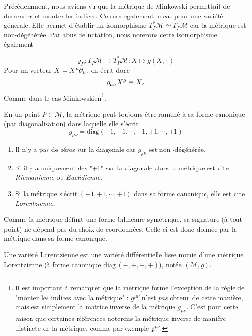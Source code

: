 Précédemment, nous avions vu que la métrique de Minkowski permettait de descendre et monter les indices. Ce sera également le cas pour une variété générale. Elle permet d'établir un isomorphisme $T^*_P \mathcal{M} \simeq T_P \mathcal{M}$ car la métrique est non-dégénérée. Par abus de notation, nous noterons cette isomorphisme également

\begin{equation}
    g_P:T_P \mathcal{M} \rightarrow T^*_P \mathcal{M}: X \mapsto g(X,\cdot\,)
\end{equation}
Pour un vecteur $X = X^\mu \partial_\mu$, on écrit donc
\begin{equation}
     g\indices{_\mu_\nu} X^\mu \equiv X_\nu
\end{equation}
Comme dans le cas Minkowskien\footnote{Il est important à remarquer que la métrique forme l'exception de la règle de "monter les indices avec la métrique" : $g^{\mu\nu}$ n'est \emph{pas} obtenu de cette manière, mais est simplement la matrice inverse de la métrique $g_{\mu\nu}$. C'est pour cette raison que certaines références noterons la métrique inverse de manière distincte de la métrique, comme par exemple $\mathfrak{g}^{\mu\nu}$.}.

\begin{rmk}
    En un point $P \in \mathcal{M}$, la métrique peut toujours être ramené à sa forme canonique (par diagonalisation) dans laquelle elle s'écrit 
    \begin{equation}
        g_{\mu \nu} = \mathrm{diag}(-1, -1, \cdots, -1, +1, \cdots, +1)
    \end{equation}

    \begin{enumerate}
        \item Il n'y a pas de zéros sur la diagonale car $g_{\mu \nu}$ est non -dégénérée. 
        \item Si il y a uniquement des "+1" sur la diagonale alors la métrique est dite \textit{Riemanienne} ou \textit{Euclidienne}.
        \item  Si la métrique s'écrit $(-1, +1, \cdots, +1)$ dans sa forme canonique, elle est dite \textit{Lorentzienne}.
    \end{enumerate}
Comme la métrique définit une forme bilinéaire symétrique, sa signature (à tout point) ne dépend pas du choix de coordonnées. Celle-ci est donc donnée par la métrique dans sa forme canonique.
\begin{theoremframe}
    \begin{defi}
        Une variété Lorentzienne est une variété différentielle lisse munie d'une métrique Lorentzienne (à forme canonique $\mathrm{diag} \,(-, +, +, +)$), notée $(\mathcal{M},g)$.
    \end{defi}
\end{theoremframe}
\end{rmk}

